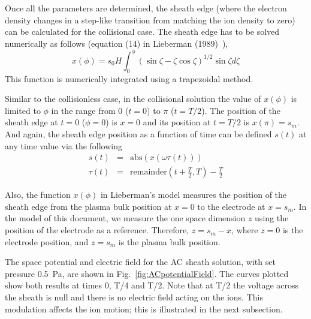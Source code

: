 Once all the parameters are determined, the sheath edge (where the electron density changes in a step-like transition from matching the ion density to zero) can be calculated for the collisional case. The sheath edge has to be solved numerically as follows (equation (14) in Lieberman (1989)~\cite{Lieberman1989}), 
\begin{equation}\label{eq:CollisionalSheathEdge}
x(\phi) = s_0  H \int_0^{\phi} (\sin \zeta - \zeta \cos \zeta)^{1/2} \sin \zeta d \zeta 
\end{equation}
This function is numerically integrated using a trapezoidal method. 

Similar to the collisionless case, in the collisional solution the value of $x(\phi)$ is limited to $\phi$ in the range from 0 ($t=0$) to $\pi$ ($t=T/2$). The position of the sheath edge at $t=0$ ($\phi = 0$) is $x=0$ and its position at $t=T/2$  is $x(\pi) = s_m$. And again, the sheath edge position as a function of time can be defined $s(t)$ at any time value via the following 
\begin{eqnarray}
s(t)    &=& \text{abs}(x(\omega \tau(t))) \\
\tau(t) &=& \text{remainder}\left(t+\frac{T}{2},T\right) - \frac{T}{2} 
\end{eqnarray}

Also, the function $x(\phi)$ in Lieberman's model measures the position of the sheath edge from the plasma bulk position at $x=0$ to the electrode at $x=s_m$. In the model of this document, we measure the one space dimension $z$ using the position of the electrode as a reference. Therefore, $z = s_m - x$, where $z=0$ is the electrode position, and $z=s_m$ is the plasma bulk position.







 








The space potential and electric field for the AC sheath solution, with set pressure 0.5~Pa, are shown in Fig.~\ref{fig:ACpotentialField}. The curves plotted show both results at times 0, T/4 and T/2. Note that at T/2 the voltage across the sheath is null and there is no electric field acting on the ions. This modulation affects the ion motion; this is illustrated in the next subsection. 

